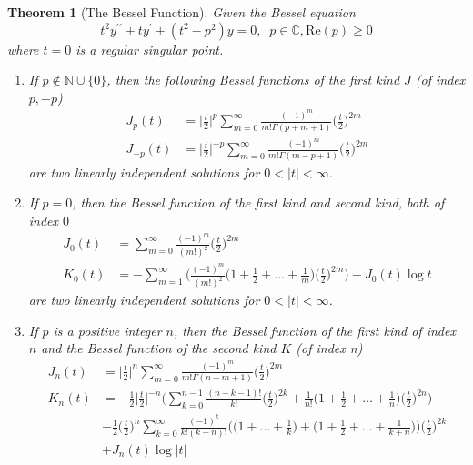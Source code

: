 \documentclass{article}
\newtheorem{theorem}{Theorem}[section]
\theoremstyle{remark}
\theoremstyle{definition}
\begin{document}
      \begin{theorem}[The Bessel Function]
      Given the Bessel equation 
      \[t^2 y^{\prime\prime} + t y^\prime + (t^2 - p^2) y = 0, \;\; p \in \mathbb{C}, \text{Re}(p) \geq 0\]
      where $t = 0$ is a regular singular point. 
      \begin{enumerate}
          \item If $p \not\in \mathbb{N} \cup \{0\}$, then the following \textit{Bessel functions of the first kind} $J$ (of index $p, -p$) 
          \begin{align*}
              J_p (t) & = \bigg| \frac{t}{2}\bigg|^p \sum_{m=0}^\infty \frac{(-1)^m}{m! \Gamma(p+m+1)} \bigg(\frac{t}{2}\bigg)^{2m} \\
              J_{-p} (t) & = \bigg| \frac{t}{2}\bigg|^{-p} \sum_{m=0}^\infty \frac{(-1)^m}{m! \Gamma(m-p+1)} \bigg(\frac{t}{2}\bigg)^{2m}
          \end{align*}
          are two linearly independent solutions for $0 < |t| < \infty$. 
          \item If $p = 0$, then the Bessel function of the first kind and second kind, both of index $0$
          \begin{align*}
              J_0 (t) & = \sum_{m=0}^\infty \frac{(-1)^m}{(m!)^2} \bigg( \frac{t}{2}\bigg)^{2m} \\
              K_0 (t) & = - \sum_{m=1}^\infty \Bigg( \frac{(-1)^m}{(m!)^2} \bigg(1 + \frac{1}{2} + \ldots + \frac{1}{m} \bigg) \bigg(\frac{t}{2}\bigg)^{2m} \Bigg) + J_0 (t) \log{t}
          \end{align*}
          are two linearly independent solutions for $0 < |t|<\infty$. 
          \item If $p$ is a positive integer $n$, then the Bessel function of the first kind of index $n$ and the \textit{Bessel function of the second kind} $K$ (of index n)
          \begin{align*}
              J_n (t) & = \bigg| \frac{t}{2}\bigg|^n \sum_{m=0}^\infty \frac{(-1)^m}{m! \Gamma(n+m+1)} \bigg(\frac{t}{2}\bigg)^{2m} \\
              K_n (t) & = -\frac{1}{2} \bigg|\frac{t}{2}\bigg|^{-n} \bigg(\sum_{k=0}^{n-1} \frac{(n-k-1)!}{k!} \bigg(\frac{t}{2}\bigg)^{2k} + \frac{1}{n!}\bigg(1 + \frac{1}{2} + \ldots + \frac{1}{n}\bigg)\bigg(\frac{t}{2}\bigg)^{2n} \Bigg) \\
              & -\frac{1}{2} \bigg(\frac{t}{2} \bigg)^n \sum_{k=0}^\infty \frac{(-1)^k}{k!(k+n)!} \bigg(\Big(1 + \ldots + \frac{1}{k}\Big) + \Big(1 + \frac{1}{2} + \ldots + \frac{1}{k+n}\Big) \bigg) \bigg(\frac{t}{2}\bigg)^{2k} \\
              & + J_n (t) \log{|t|}
          \end{align*}
      \end{enumerate}
      \end{theorem}
\end{document}

